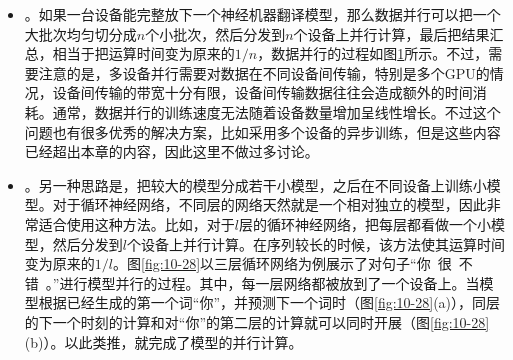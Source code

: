 \vspace{-0.5em}
\begin{itemize}

\begin{figure}[htp]
\centering

\caption{数据并行过程}
\label{fig:10-27}
\end{figure}

\item {\small{}}。如果一台设备能完整放下一个神经机器翻译模型，那么数据并行可以把一个大批次均匀切分成$n$个小批次，然后分发到$n$个设备上并行计算，最后把结果汇总，相当于把运算时间变为原来的${1}/{n}$，数据并行的过程如图\ref{fig:10-27}所示。不过，需要注意的是，多设备并行需要对数据在不同设备间传输，特别是多个GPU的情况，设备间传输的带宽十分有限，设备间传输数据往往会造成额外的时间消耗。通常，数据并行的训练速度无法随着设备数量增加呈线性增长。不过这个问题也有很多优秀的解决方案，比如采用多个设备的异步训练，但是这些内容已经超出本章的内容，因此这里不做过多讨论。

\item {\small{}}。另一种思路是，把较大的模型分成若干小模型，之后在不同设备上训练小模型。对于循环神经网络，不同层的网络天然就是一个相对独立的模型，因此非常适合使用这种方法。比如，对于$l$层的循环神经网络，把每层都看做一个小模型，然后分发到$l$个设备上并行计算。在序列较长的时候，该方法使其运算时间变为原来的${1}/{l}$。图\ref{fig:10-28}以三层循环网络为例展示了对句子“你\ 很\ 不错\ 。”进行模型并行的过程。其中，每一层网络都被放到了一个设备上。当模型根据已经生成的第一个词“你”，并预测下一个词时（图\ref{fig:10-28}(a)），同层的下一个时刻的计算和对“你”的第二层的计算就可以同时开展（图\ref{fig:10-28}(b)）。以此类推，就完成了模型的并行计算。

\end{itemize}

